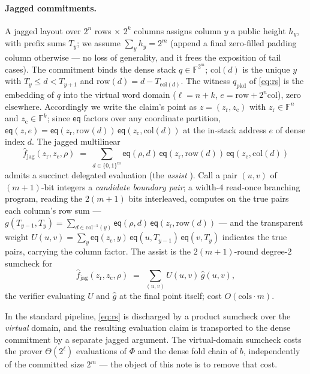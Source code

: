 \documentclass[11pt]{article}
\newcommand{\F}{\mathbb{F}}
\newcommand{\eq}{\mathsf{eq}}
\newcommand{\rowof}{\mathrm{row}}
\newcommand{\colof}{\mathrm{col}}
\newcommand{\fjag}{\hat f_{\mathrm{jag}}}
\newcommand{\qpkd}{q_{\mathrm{pkd}}}
\begin{document}
\paragraph{Jagged commitments.} A jagged layout over $2^{n}$ rows
$\times$ $2^{k}$ columns assigns column $y$ a public height $h_y$, with
prefix sums $T_y$; we assume $\sum_y h_y = 2^m$ (append a final
zero-filled padding column otherwise --- no loss of generality, and it
frees the exposition of tail cases). The commitment binds the dense
stack $q \in \F^{2^m}$; $\colof(d)$ is the unique $y$ with
$T_y \le d < T_{y+1}$ and $\rowof(d) = d - T_{\colof(d)}$. The witness $\qpkd$ of \eqref{eq:rs} is
the embedding of $q$ into the virtual word domain
($\ell = n + k$, $e = \rowof + 2^n\colof$), zero elsewhere.
Accordingly we write the claim's point as
$z = (z_{\mathrm r}, z_{\mathrm c})$ with $z_{\mathrm r} \in \F^{n}$
and $z_{\mathrm c} \in \F^{k}$; since $\eq$ factors over any
coordinate partition,
$\eq(z, e) = \eq(z_{\mathrm r}, \rowof(d))\,
\eq(z_{\mathrm c}, \colof(d))$ at the in-stack address $e$ of dense
index $d$. The jagged
multilinear
\[
  \fjag(z_{\mathrm r}, z_{\mathrm c}, \rho)
  \;=\;
  \sum_{d \in \{0,1\}^m}
    \eq(\rho, d)\,
    \eq(z_{\mathrm r}, \rowof(d))\,
    \eq(z_{\mathrm c}, \colof(d))
\]
admits a succinct delegated evaluation (the \emph{assist}
\cite{jagged}). Call a pair $(u, v)$ of $(m{+}1)$-bit integers a
\emph{candidate boundary pair}; a width-$4$ read-once branching
program, reading the $2(m{+}1)$ bits interleaved, computes on the true
pairs each column's row sum ---
$g(T_{y-1}, T_y) = \sum_{d \in \colof^{-1}(y)}
\eq(\rho, d)\, \eq(z_{\mathrm r}, \rowof(d))$ --- and the transparent
weight
$U(u, v) = \sum_y \eq(z_{\mathrm c}, y)\, \eq(u, T_{y-1})\,
\eq(v, T_y)$ indicates the true pairs, carrying the column factor.
The assist is the $2(m{+}1)$-round degree-$2$ sumcheck for
\begin{equation}\label{eq:assist}
  \fjag(z_{\mathrm r}, z_{\mathrm c}, \rho)
  \;=\;
  \sum_{(u,v)} U(u, v)\, \hat g(u, v),
\end{equation}
the verifier evaluating $U$ and $\hat g$ at the final point itself;
cost $O(\mathrm{cols}\cdot m)$.

In the standard pipeline, \eqref{eq:rs} is discharged by a product
sumcheck over the \emph{virtual} domain, and the resulting evaluation
claim is transported to the dense commitment by a separate jagged
argument. The virtual-domain sumcheck costs the prover
$\Theta(2^{\ell})$ evaluations of $\Phi$ and the dense fold chain of
$b$, independently of the committed size $2^m$ --- the object of this
note is to remove
that cost.
\end{document}
